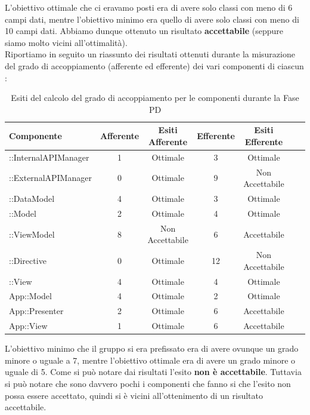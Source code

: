 				L'obiettivo ottimale che ci eravamo posti era di avere solo classi con meno di 6 campi dati, mentre l'obiettivo minimo era quello di avere solo classi con meno di 10 campi dati. Abbiamo dunque ottenuto un risultato \textbf{accettabile} (seppure siamo molto vicini all'ottimalità).\\
				Riportiamo in seguito un riassunto dei risultati ottenuti durante la misurazione del grado di accoppiamento (afferente ed efferente) dei vari componenti di ciascun :
				\begin{table}[H]
					\centering
					\begin{tabu}{| l | c | c | c | c | c | c | }
						\hline
						Componente					& Afferente & Esiti Afferente & Efferente & Esiti Efferente 	\\ \hline \hline
						::InternalAPIManager	& 1 & Ottimale & 3 & Ottimale  \\ \hline
						::ExternalAPIManager  & 0 & Ottimale & 9 & Non Accettabile   \\ \hline
						::DataModel  			& 4 & Ottimale & 3 & Ottimale   \\ \hline
						::Model 				& 2 & Ottimale & 4 & Ottimale   \\ \hline
						::ViewModel 			& 8 & Non Accettabile & 6 & Accettabile   \\ \hline
						::Directive 			& 0 & Ottimale & 12 & Non Accettabile   \\ \hline
						::View 				& 4 & Ottimale & 4 & Ottimale   \\ \hline
						App::Model 					& 4 & Ottimale & 2 & Ottimale   \\ \hline
						App::Presenter 				& 2 & Ottimale & 6 & Accettabile   \\ \hline
						App::View 					& 1 & Ottimale & 6 & Accettabile   \\ \hline
					\end{tabu}
					\caption{Esiti del calcolo del grado di accoppiamento per le componenti durante la Fase PD}
				\end{table}
				L'obiettivo minimo che il gruppo si era prefissato era di avere ovunque un grado minore o uguale a 7, mentre l'obiettivo ottimale era di avere un grado minore o uguale di 5. Come si può notare dai risultati l'esito \textbf{non è accettabile}. Tuttavia si può notare che sono davvero pochi i componenti che fanno si che l'esito non possa essere accettato, quindi si è vicini all'ottenimento di un risultato accettabile.
